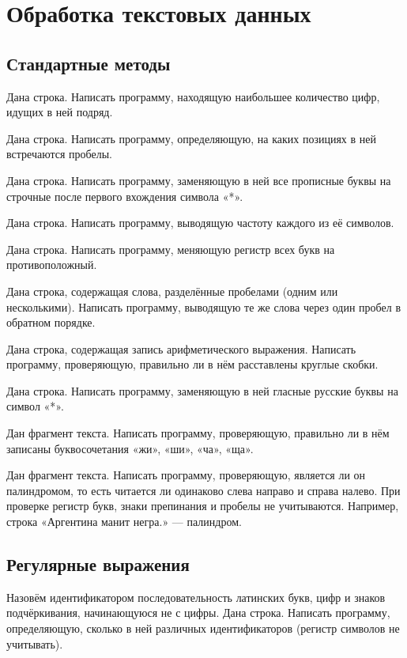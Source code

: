 \section{Обработка текстовых данных}

\subsection{Стандартные методы}

\task Дана строка. Написать программу, находящую наибольшее количество
цифр, идущих в ней подряд.

\task Дана строка. Написать программу, определяющую, на каких позициях
в ней встречаются пробелы.

\task Дана строка. Написать программу, заменяющую в ней все прописные
буквы на строчные после первого вхождения символа «*».

\task Дана строка. Написать программу, выводящую частоту каждого из её
символов.

\task Дана строка. Написать программу, меняющую регистр всех букв на
противоположный.

\task Дана строка, содержащая слова, разделённые пробелами (одним или
несколькими). Написать программу, выводящую те же слова через один
пробел в обратном порядке.

\task Дана строка, содержащая запись арифметического
выражения. Написать программу, проверяющую, правильно ли в нём
расставлены круглые скобки.

\task Дана строка. Написать программу, заменяющую в ней гласные
русские буквы на символ «*».

\task Дан фрагмент текста. Написать программу, проверяющую, правильно
ли в нём записаны буквосочетания «жи», «ши», «ча», «ща».

\task Дан фрагмент текста. Написать программу, проверяющую, является
ли он палиндромом, то есть читается ли одинаково слева направо и
справа налево. При проверке регистр букв, знаки препинания и пробелы
не учитываются. Например, строка «Аргентина манит негра.» — палиндром.

\subsection{Регулярные выражения}

\task Назовём идентификатором последовательность латинских букв, цифр
и знаков подчёркивания, начинающуюся не с цифры. Дана строка. Написать
программу, определяющую, сколько в ней различных идентификаторов
(регистр символов не учитывать).

